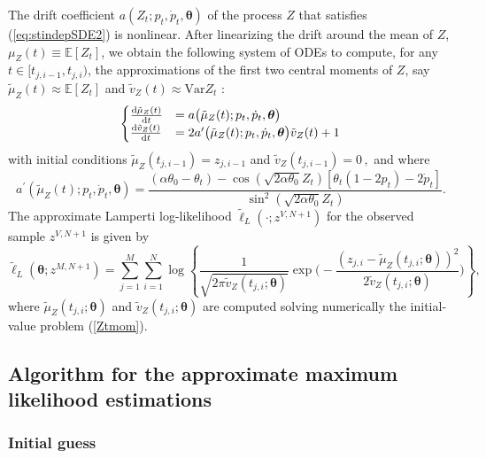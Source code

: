\documentclass[11pt]{article}
\theoremstyle{definition}
\begin{document}
The drift coefficient $a(Z_t; p_t, \dot{p}_t, \bm{\theta}) $ of the process $Z$ that satisfies (\ref{eq:stindepSDE2}) is nonlinear. After linearizing the drift around the mean of $Z$, $\mu_Z(t) \equiv \mathbb{E}\left[Z_t\right]$,  we obtain the following system of ODEs to compute, for any $t\in [t_{j,i-1}, t_{j, i})$, the approximations of the first two central moments of $Z$, say  $\tilde{\mu}_Z(t) \approx \mathbb{E}\left[Z_t\right]$ and $\tilde{v}_Z(t) \approx \text{Var} Z_t$ :\\
\begin{equation}
\begin{cases}
\frac{\dif  \tilde{\mu}_Z (t)}{\dif t}&=  a\big( \tilde{\mu}_Z (t) ; p_t, \dot{p}_t, \bm{\theta} \big)   \\
\frac{\dif  \tilde{v}_Z (t)}{\dif t}&= 2  a^{\prime} \big( \tilde{\mu}_Z (t) ; p_t, \dot{p}_t, \bm{\theta} \big) \tilde{v}_Z (t) + 1
\end{cases}
\label{Ztmom}
\end{equation}
with initial conditions $\tilde{\mu}_Z(t_{j,i-1})= z_{j, i-1}$ and $\tilde{v}_Z(t_{j,i-1})= 0 \,,$ and where 
\begin{equation*}
a^{\prime} \left( \tilde{\mu}_Z (t) ; p_t, \dot{p}_t, \bm{\theta} \right) =    \frac{  (\alpha \theta_0 - \theta_t)  - \cos(\sqrt{2 \alpha \theta_0 } Z_t) [ \theta_t (1 - 2 p_t) - 2  \dot{p}_t ] }{\sin^2{(\sqrt{2 \alpha \theta_0} Z_t)}}.
\end{equation*}
The approximate Lamperti log-likelihood $\tilde{\ell}_L\left(\cdot ; z^{V, N+1}\right)$ for the observed sample $z^{V, N+1}$ is given by
\begin{equation}
\tilde{\ell}_L \left(\bm{\theta}; z^{M,N +1}\right) = \sum_{j=1}^M \sum_{i=1}^N \log \left\{ \frac{1}{\sqrt{2 \pi \tilde{v}_Z(t_{j,i}; \bm{\theta})}} \exp \Bigg( -\frac{(z_{j,i} - \tilde{\mu}_Z(t_{j,i};\bm{\theta} ))^2}{2 \tilde{v}_Z(t_{j,i}; \bm{\theta})} \Bigg) \right\},
\label{loglikelihoodZ}
\end{equation}
where $\tilde{\mu}_Z(t_{j,i};\bm{\theta} )$ and $\tilde{v}_Z(t_{j,i};\bm{\theta} )$ are computed solving numerically the initial-value problem (\ref{Ztmom}). 

\subsection{Algorithm for the approximate maximum likelihood estimations} \label{opt_sec}

\subsubsection{Initial guess}
\end{document}
